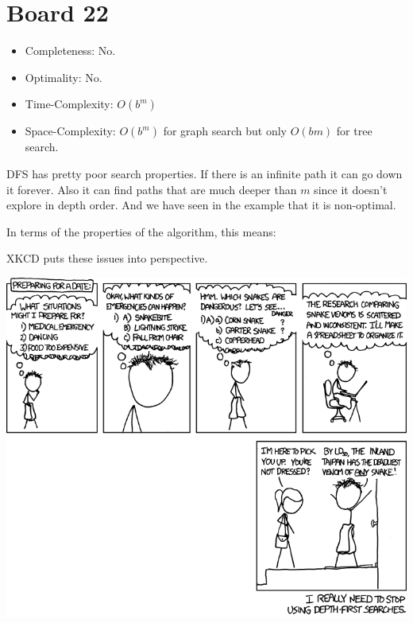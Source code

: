 \documentclass[10pt]{article}
\begin{document}

\section{Board 22}

\begin{itemize}
\item Completeness: No.
\item Optimality: No.
\item Time-Complexity: $O(b^m)$ 
\item Space-Complexity: $O(b^m)$ for graph search but only $O(bm)$ for tree search.
\end{itemize}

\noindent 

\noindent 
DFS has pretty poor search properties. If there is an
infinite path it can go down it forever. Also 
it can find paths that are much deeper than $m$ since 
it doesn't explore in depth order. And we have seen in the
example that it is non-optimal.

In terms of the properties of the algorithm, this means: 


XKCD puts these issues into perspective.

\begin{center}
  \includegraphics[width=\textwidth]{pics/dfs}
\end{center}
\end{document}
